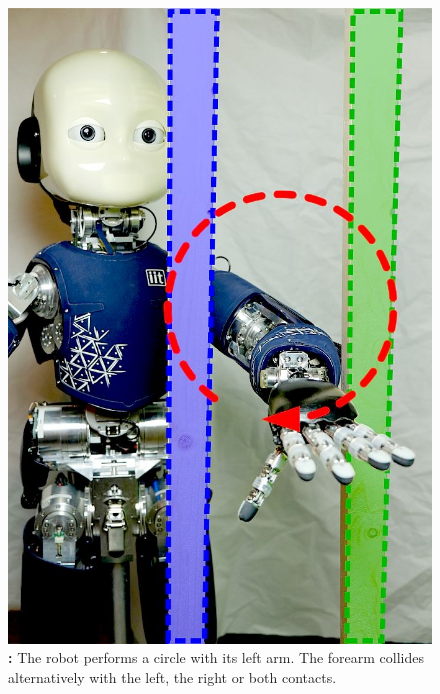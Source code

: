 	\begin{figure}[t]
		\begin{minipage}{.32\linewidth}
			\centering
			\includegraphics[width =.99\linewidth]{robertoICRA/fig/iCubParis02_Double_Contact}
			\caption{\textbf{:} The robot performs a circle with its left arm. 
			The forearm collides alternatively with the left, the right or both contacts.}
			\label{fig:exp3:icuparis_experiment_bars}
		\end{minipage}	
		\hfill
		\begin{minipage}{.52\linewidth}
			\centering

\end{minipage}
\end{figure}
